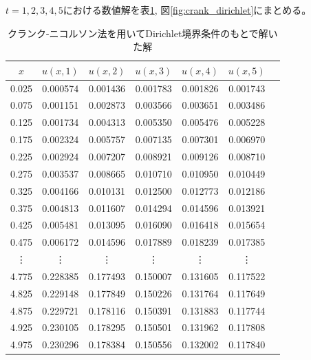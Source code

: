 \documentclass[a4j, titlepage]{jsarticle}
\numberwithin{equation}{section}
\begin{document}
            $t = 1, 2, 3, 4, 5$における数値解を表\ref{tab:crank_dirichlet}, 図\ref{fig:crank_dirichlet}にまとめる。
            \begin{table}[h]
                \caption{クランク-ニコルソン法を用いてDirichlet境界条件のもとで解いた解}
                \label{tab:crank_dirichlet}
                \centering
                \begin{tabular}{ccccccc}
                    \hline
                    $x$ & $u(x, 1)$ & $u(x, 2)$ & $u(x, 3)$ & $u(x, 4)$ & $u(x, 5)$
                    \\
                    \hline
                    \hline
                    0.025 & 0.000574 & 0.001436 & 0.001783 & 0.001826 & 0.001743 \\
                    0.075 & 0.001151 & 0.002873 & 0.003566 & 0.003651 & 0.003486 \\
                    0.125 & 0.001734 & 0.004313 & 0.005350 & 0.005476 & 0.005228 \\
                    0.175 & 0.002324 & 0.005757 & 0.007135 & 0.007301 & 0.006970 \\
                    0.225 & 0.002924 & 0.007207 & 0.008921 & 0.009126 & 0.008710 \\
                    0.275 & 0.003537 & 0.008665 & 0.010710 & 0.010950 & 0.010449 \\
                    0.325 & 0.004166 & 0.010131 & 0.012500 & 0.012773 & 0.012186 \\
                    0.375 & 0.004813 & 0.011607 & 0.014294 & 0.014596 & 0.013921 \\
                    0.425 & 0.005481 & 0.013095 & 0.016090 & 0.016418 & 0.015654 \\
                    0.475 & 0.006172 & 0.014596 & 0.017889 & 0.018239 & 0.017385 \\
                    \vdots & \vdots & \vdots & \vdots & \vdots & \vdots \vspace{1mm} \\
                    4.775 & 0.228385 & 0.177493 & 0.150007 & 0.131605 & 0.117522 \\
                    4.825 & 0.229148 & 0.177849 & 0.150226 & 0.131764 & 0.117649 \\
                    4.875 & 0.229721 & 0.178116 & 0.150391 & 0.131883 & 0.117744 \\
                    4.925 & 0.230105 & 0.178295 & 0.150501 & 0.131962 & 0.117808 \\
                    4.975 & 0.230296 & 0.178384 & 0.150556 & 0.132002 & 0.117840 \\

\end{tabular}
\end{table}
\end{document}
